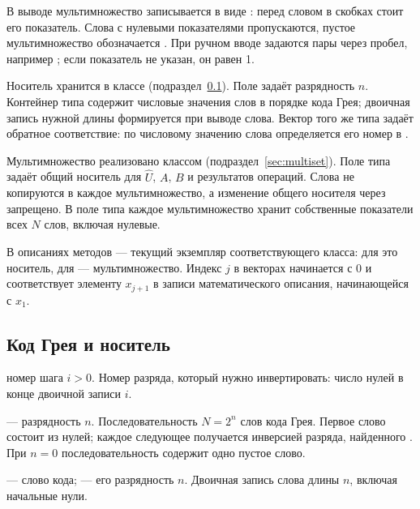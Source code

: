 В выводе мультимножество записывается в виде : перед словом в скобках стоит его показатель. Слова с нулевыми показателями пропускаются, пустое мультимножество обозначается . При ручном вводе задаются пары  через пробел, например ; если показатель не указан, он равен 1.

Носитель хранится в классе  (подраздел~\ref{sec:codeset}). Поле  задаёт разрядность $n$. Контейнер  типа  содержит числовые значения слов в порядке кода Грея; двоичная запись нужной длины формируется при выводе слова. Вектор  того же типа задаёт обратное соответствие: по числовому значению слова определяется его номер в .

Мультимножество реализовано классом  (подраздел~\ref{sec:multiset}). Поле  типа  задаёт общий носитель для $\hat U$, $A$, $B$ и результатов операций. Слова не копируются в каждое мультимножество, а изменение общего носителя через  запрещено. В поле  типа  каждое мультимножество хранит собственные показатели всех $N$ слов, включая нулевые.

В описаниях методов  — текущий экземпляр соответствующего класса: для  это носитель, для  — мультимножество. Индекс $j$ в векторах начинается с 0 и соответствует элементу $x_{j+1}$ в записи математического описания, начинающейся с $x_1$.

\subsection{Код Грея и носитель}
\label{sec:codeset}

{номер шага $i>0$.}
{Номер разряда, который нужно инвертировать: число нулей в конце двоичной записи $i$.}

{ — разрядность $n$.}
{Последовательность $N=2^n$ слов кода Грея. Первое слово состоит из нулей; каждое следующее получается инверсией разряда, найденного . При $n=0$ последовательность содержит одно пустое слово.}

{ — слово кода;  — его разрядность $n$.}
{Двоичная запись слова длины $n$, включая начальные нули.}

